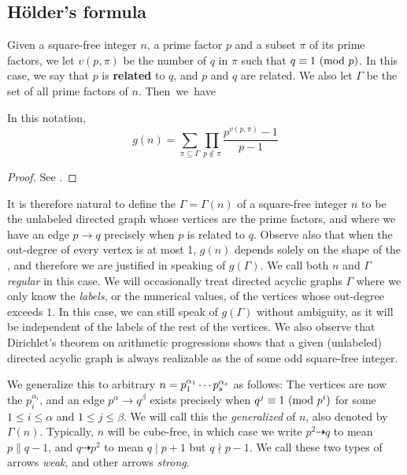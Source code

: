 \subsection{Hölder's formula}
Given a square-free integer $n$, a prime factor $p$ and a subset $\pi$ of its prime factors, we let $v(p, \pi)$ be the number of $q$ in $\pi$ such that $q \equiv 1 \ (\mathrm{mod} \ p)$.
In this case, we say that $p$ is \textbf{related} to $q$, and $p$ and $q$ are related.
We also let $\Gamma$ be the set of all prime factors of $n$.
\mbox{Then we have}
\begin{thm} In this notation,
	\begin{equation*}
		g(n) = \sum_{\pi \subseteq \Gamma} \prod_{p \notin \pi} \frac{p^{v(p, \pi)} - 1}{p - 1}
	\end{equation*}
\end{thm}
\begin{proof} See {\cite[Thm.~5.1]{gnumoas}}.
\end{proof}

It is therefore natural to define the \emph{} $\Gamma = \Gamma(n)$ of a square-free integer $n$ to be the unlabeled directed graph whose vertices are the prime factors, and where we have an edge $p \rightarrow q$ precisely when $p$ is related to $q$.
Observe also that when the out-degree of every vertex is at most 1, $g(n)$ depends solely on the shape of the , and therefore we are justified in speaking of $g(\Gamma)$.
We call both $n$ and $\Gamma$ \emph{regular} in this case.
We will occasionally treat directed acyclic graphs $\Gamma$ where we only know the \emph{labels}, or the numerical values, of the vertices whose out-degree exceeds $1$.
In this case, we can still speak of $g(\Gamma)$ without ambiguity, as it will be independent of the labels of the rest of the vertices.
We also observe that Dirichlet's theorem on arithmetic progressions shows that a given (unlabeled) directed acyclic graph is always realizable as the  of some odd square-free integer.

We generalize this to arbitrary $n = p_1^{\alpha_1} \cdots p_s^{\alpha_s}$ as follows: The vertices are now the $p_i^{\alpha_i}$, and an edge $p^\alpha \rightarrow q^\beta$ exists precisely when $q^j \equiv 1 \ (\mathrm{mod} \ p^i)$ for some $1 \le i \le \alpha$ and $1 \le j \le \beta$.
We will call this the \emph{generalized \hg} of $n$, also denoted by $\Gamma(n)$.
Typically, $n$ will be cube-free, in which case we write $p^2 \dashrightarrow q$ to mean $p \parallel q - 1$, and $q \dashrightarrow p^2$ to mean $q \mid p + 1$ but $q \nmid p - 1$.
We call these two types of arrows \emph{weak}, and other arrows \emph{strong}.

